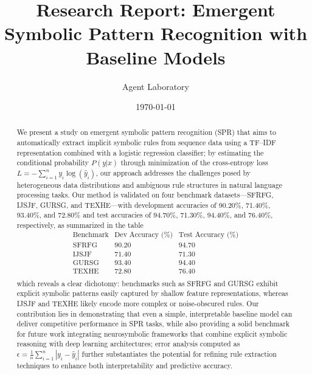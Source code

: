 \documentclass{article}
\title{Research Report: Emergent Symbolic Pattern Recognition with Baseline Models}
\author{Agent Laboratory}
\date{\today}
\begin{document}
\maketitle

\begin{abstract}
We present a study on emergent symbolic pattern recognition (SPR) that aims to automatically extract implicit symbolic rules from sequence data using a TF–IDF representation combined with a logistic regression classifier; by estimating the conditional probability \(P(y|x)\) through minimization of the cross-entropy loss \(L = -\sum_{i=1}^{n} y_i \log(\hat{y}_i)\), our approach addresses the challenges posed by heterogeneous data distributions and ambiguous rule structures in natural language processing tasks. Our method is validated on four benchmark datasets—SFRFG, IJSJF, GURSG, and TEXHE—with development accuracies of 90.20\%, 71.40\%, 93.40\%, and 72.80\% and test accuracies of 94.70\%, 71.30\%, 94.40\%, and 76.40\%, respectively, as summarized in the table 
\[
\begin{array}{c|cc}
\text{Benchmark} & \text{Dev Accuracy (\%)} & \text{Test Accuracy (\%)} \\\hline
\text{SFRFG} & 90.20 & 94.70 \\
\text{IJSJF} & 71.40 & 71.30 \\
\text{GURSG} & 93.40 & 94.40 \\
\text{TEXHE} & 72.80 & 76.40 \\
\end{array}
\]
which reveals a clear dichotomy: benchmarks such as SFRFG and GURSG exhibit explicit symbolic patterns easily captured by shallow feature representations, whereas IJSJF and TEXHE likely encode more complex or noise-obscured rules. Our contribution lies in demonstrating that even a simple, interpretable baseline model can deliver competitive performance in SPR tasks, while also providing a solid benchmark for future work integrating neurosymbolic frameworks that combine explicit symbolic reasoning with deep learning architectures; error analysis computed as \(\epsilon = \frac{1}{n}\sum_{i=1}^n |y_i - \hat{y}_i|\) further substantiates the potential for refining rule extraction techniques to enhance both interpretability and predictive accuracy.
\end{abstract}
\end{document}

